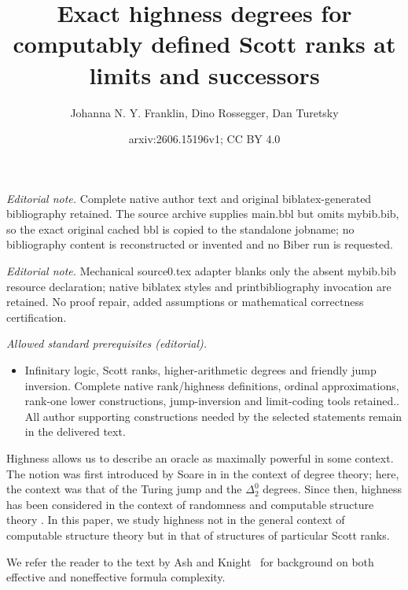 \documentclass[10pt,a4paper]{amsart}
\title{Exact highness degrees for computably defined Scott ranks at limits and successors}
\author{Johanna N. Y. Franklin, Dino Rossegger, Dan Turetsky}
\date{arxiv:2606.15196v1; CC BY 4.0}
\newcommand\+[1]{\mathcal{#1}}
\renewcommand\*[1]{\mathbf{#1}}
\renewcommand\=[1]{\text{#1}}
\renewcommand\*[1]{\mathbf{#1}}
\begin{document}
\maketitle
\noindent\textit{Editorial note.} Complete native author text and original biblatex-generated bibliography retained. The source archive supplies main.bbl but omits mybib.bib, so the exact original cached bbl is copied to the standalone jobname; no bibliography content is reconstructed or invented and no Biber run is requested.\par\medskip
\noindent\textit{Editorial note.} Mechanical source0.tex adapter blanks only the absent mybib.bib resource declaration; native biblatex styles and printbibliography invocation are retained. No proof repair, added assumptions or mathematical correctness certification.\par\medskip
\noindent\textit{Allowed standard prerequisites (editorial).}\begin{itemize}
\item Infinitary logic, Scott ranks, higher-arithmetic degrees and friendly jump inversion. Complete native rank/highness definitions, ordinal approximations, rank-one lower constructions, jump-inversion and limit-coding tools retained.. All author supporting constructions needed by the selected statements remain in the delivered text.
\end{itemize}\medskip
Highness allows us to describe an oracle as maximally powerful in some context. The notion was first introduced by Soare in \cite{s72} in the context of degree theory; here, the context was that of the Turing jump and the $\Delta^0_2$ degrees. Since then, highness has been considered in the context of randomness \cite{fsy-bases} and computable structure theory \cite{cft23,cft}. In this paper, we study highness not in the general context of computable structure theory but in that of structures of particular Scott ranks.

We refer the reader to the text by Ash and Knight~\cite{ash2000} for background on both effective and noneffective formula complexity.
\end{document}
